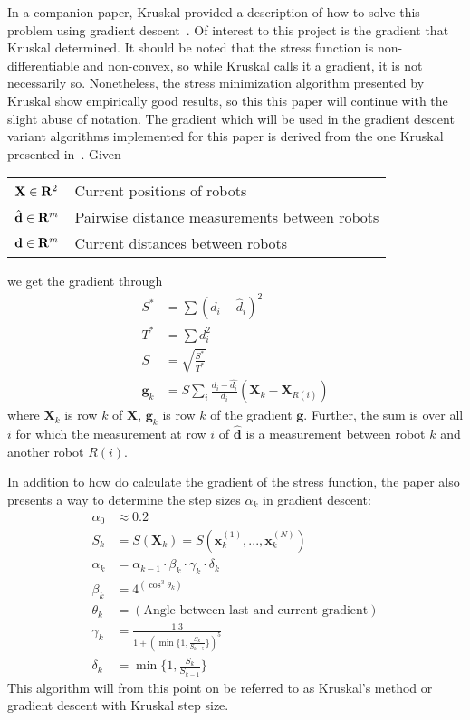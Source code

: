 In a companion paper, Kruskal provided a description of how to solve this problem using gradient descent~\cite{kruskal1964implementation}. Of interest to this project is the gradient that Kruskal determined. It should be noted that the stress function is non-differentiable and non-convex, so while Kruskal calls it a gradient, it is not necessarily so. Nonetheless, the stress minimization algorithm presented by Kruskal show empirically good results, so this this paper will continue with the slight abuse of notation. The gradient which will be used in the gradient descent variant algorithms implemented for this paper is derived from the one Kruskal presented in~\cite{kruskal1964implementation}. Given 
\begin{table}[ht]
    \centering
    \begin{tabularx}{\linewidth}{lX}
        $\mathbf{X} \in \mathbf{R}^{2}$ & Current positions of robots \\
        $\hat{\mathbf{d}} \in \mathbf{R}^{m}$ & Pairwise distance measurements between robots \\
        $\mathbf{d} \in \mathbf{R}^{m}$ & Current distances between robots 
    \end{tabularx}
\end{table}
\FloatBarrier 
\noindent we get the gradient through
\begin{align}
    S^* &= \sum \left({d}_{i} - \hat{{d}}_{i}\right)^2 \\
    T^* &= \sum {d}_{i}^2 \\
    S   &= \sqrt{\frac{S^*}{T^*}} \\
    \mathbf{g}_k &= S \sum_{i} \frac{{d}_i - \hat{{d}_i}}{{d}_i} (\mathbf{X}_k - \mathbf{X}_{R(i)})
\end{align}
where $\mathbf{X}_k$ is row $k$ of $\mathbf{X}$, $\mathbf{g}_k$ is row $k$ of the gradient $\mathbf{g}$. Further, the sum is over all $i$ for which the measurement at row $i$ of $\hat{\mathbf{d}}$ is a measurement between robot $k$ and another robot $R(i)$.

In addition to how do calculate the gradient of the stress function, the paper also presents a way to determine the step sizes $\alpha_k$ in gradient descent:
\begin{align}
    \alpha_0 &\approx 0.2 \\
    S_k &= S(\mathbf{X}_k) = S(\mathbf{x}^{(1)}_k, ..., \mathbf{x}^{(N)}_k) \\
    \alpha_{k} &= \alpha_{k-1} \cdot \beta_k \cdot \gamma_k \cdot \delta_k \\
    \beta_k &= 4^{(\cos^3 \theta_k)} \\
    \theta_k &= (\text{Angle between last and current gradient}) \\
    \gamma_k &= \frac{1.3}{1 + (\min\{1, \frac{S_k}{S_{k-5}}\})^5} \\
    \delta_k &= \min\{1, \frac{S_k}{S_{k-1}}\}
\end{align}
This algorithm will from this point on be referred to as Kruskal's method or gradient descent with Kruskal step size. 


